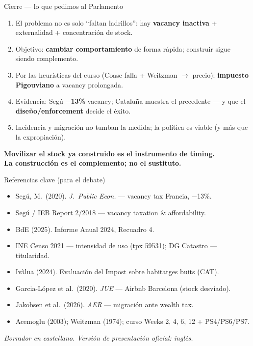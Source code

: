 \documentclass[aspectratio=169,11pt]{beamer}
\begin{document}
\begin{frame}{Cierre --- lo que pedimos al Parlamento}
  \begin{enumerate}\setlength\itemsep{0.55em}
    \item El problema no es solo ``faltan ladrillos'': hay \textbf{vacancy inactiva} + externalidad
          + concentración de stock.
    \item Objetivo: \textbf{cambiar comportamiento} de forma rápida; construir sigue siendo complemento.
    \item Por las heurísticas del curso (Coase falla + Weitzman $\rightarrow$ precio):
          \textbf{impuesto Pigouviano} a vacancy prolongada.
    \item Evidencia: Segú \textbf{$-$13\%} vacancy; Cataluña muestra el precedente --- y que el
          \textbf{diseño/enforcement} decide el éxito.
    \item Incidencia y migración no tumban la medida; la política es viable (y más que la expropiación).
  \end{enumerate}
  \vspace{0.6em}
  \centering
  \large\textbf{Movilizar el stock ya construido es el instrumento de timing.\\
  La construcción es el complemento; no el sustituto.}
\end{frame}

\begin{frame}{Referencias clave (para el debate)}
  \footnotesize
  \begin{itemize}\setlength\itemsep{0.35em}
    \item Segú, M.\ (2020). \textit{J.\ Public Econ.} --- vacancy tax Francia, $-$13\%.
    \item Segú / IEB Report 2/2018 --- vacancy taxation \& affordability.
    \item BdE (2025). Informe Anual 2024, Recuadro 4.
    \item INE Censo 2021 --- intensidad de uso (tpx 59531); DG Catastro --- titularidad.
    \item Ivàlua (2024). Evaluación del Impost sobre habitatges buits (CAT).
    \item Garcia-López et al.\ (2020). \textit{JUE} --- Airbnb Barcelona (stock desviado).
    \item Jakobsen et al.\ (2026). \textit{AER} --- migración ante wealth tax.
    \item Acemoglu (2003); Weitzman (1974); curso Weeks 2, 4, 6, 12 + PS4/PS6/PS7.
  \end{itemize}
  \vspace{0.8em}
  \centering
  {\small\textit{Borrador en castellano. Versión de presentación oficial: inglés.}}
\end{frame}
\end{document}

